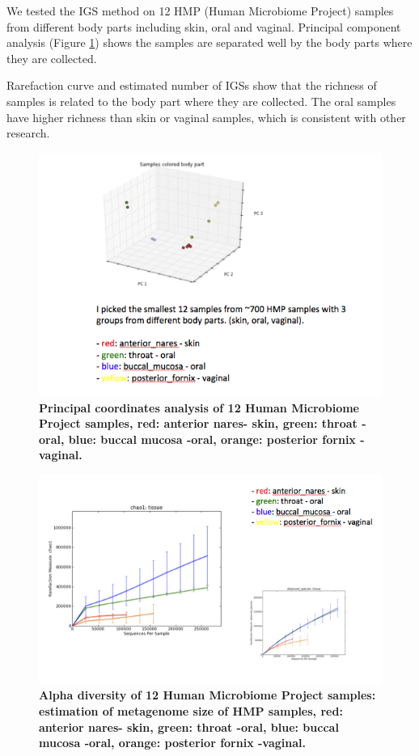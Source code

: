 \documentclass{article}
\begin{document}
We tested the IGS method on 12 HMP (Human Microbiome Project) samples from 
different body parts including skin, oral and vaginal.
Principal component analysis (Figure \ref{fig:HMP_beta}) shows the samples are 
separated well by the body parts where they are collected.%

Rarefaction curve and estimated number of IGSs show that the richness of 
samples is related to the body part where they are collected. The 
oral samples have higher richness than skin or vaginal samples, 
which is consistent with other research. \cite{Human-Microbiome-Project-Consortium:2012aa}



\begin{figure}[!ht]
 \centerline{\includegraphics[width=6in]{./figures/HMP_beta.png}}
\caption{\bf Principal coordinates analysis of 12 Human Microbiome Project
samples, red: anterior nares- skin, green: throat -oral, blue: buccal mucosa -oral, orange: 
posterior fornix -vaginal.}
\label{fig:HMP_beta}
\end{figure}

\begin{figure}[!ht]
 \centerline{\includegraphics[width=6in]{./figures/HMP_alpha.png}}
\caption{\bf Alpha diversity of 12 Human Microbiome Project samples:
 estimation of metagenome size of HMP samples,
red: anterior nares- skin, green: throat -oral, blue: buccal mucosa -oral, orange: 
posterior fornix -vaginal.}
\label{fig:HMP_alpha}
\end{figure}
\end{document}
